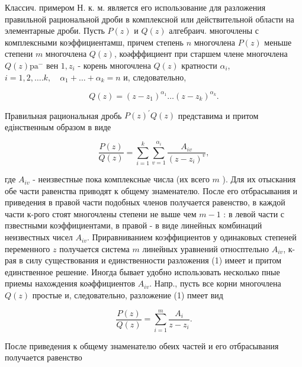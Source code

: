 \documentclass[10pt]{article}
\begin{document}
Классич. примером Н. к. м. является его использование для разложения правильной рациональной дроби в комплексной или действительной области на элементарные дроби. Пусть $P(z)$ и $Q(z)$ алгебраич. многочлены с комплексными коэффициентамш, причем степень $n$ многочлена $P(z)$ меньше степени $m$ многочлена $Q(z)$, коәфффициент при старшем члене многочлена $Q(z) \mathrm{pa}^{-}$ вен $1, z_{i}$ - корень многочлена $Q(z)$ кратности $\alpha_{i}$, $i=1,2, \ldots . k, \quad \alpha_{1}+\ldots+\alpha_{k}=n$ и, следовательно,



\[

Q(z)=\left(z-z_{1}\right)^{\alpha_{1}} \ldots\left(z-z_{k}\right)^{\alpha_{k}} .

\]



Правильная рациональная дробь $P(z)^{\prime} Q(z)$ представима и притом едінственным образом в виде



\[

\frac{P(z)}{Q(z)}=\sum_{i=1}^{k} \sum_{v=1}^{\alpha_{i}} \frac{A_{i v}}{\left(z-z_{i}\right)^{v}},

\]



где $A_{i v}$ - неизвестные пока комплексные числа (их всего $m$ ). Для их отыскания обе части равенства приводят к общему знаменателю. После его отбрасывания и приведения в правой части подобных членов получается равенство, в каждой части к-рого стоят многочлены степени не выше чем $m-1$ : в левой части с пзвестными коэффициентами, в правой - в виде линейных комбинаций неизвестных чисел $A_{i v}$. Приравниванием коэффициентов у одинаковых степеней переменного $z$ получается система $m$ линейных уравнений относптельно $A_{i v}$, к-рая в силу существования и единственности разложения (1) имеет и притом единственное решение. Иногда бывает удобно использовать несколько пные приемы нахождения коәффициентов $A_{i v}$. Напр., пусть все корни многочлена $Q(z)$ простые и, следовательно, разложение (1) пмеет вид



\[

\frac{P(z)}{Q(z)}=\sum_{i=1}^{m} \frac{A_{i}}{z-z_{i}} .

\]



После приведения к общему знаменателю обеих частей и его отбрасывания получается равенство
\end{document}
